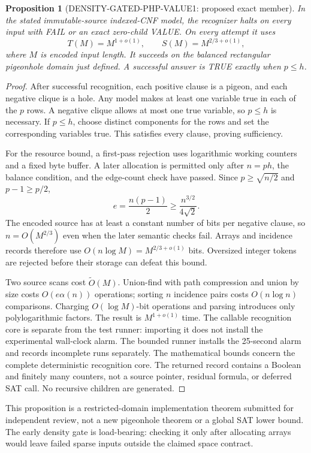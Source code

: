 \documentclass[11pt]{article}
\newtheorem{proposition}{Proposition}
\begin{document}
\begin{proposition}[DENSITY-GATED-PHP-VALUE1: proposed exact member]
In the stated immutable-source indexed-CNF model, the recognizer halts on every input with FAIL or an exact zero-child VALUE. On every attempt it uses
\[
 T(M)=M^{1+o(1)},\qquad S(M)=M^{2/3+o(1)},
\]
where $M$ is encoded input length. It succeeds on the balanced rectangular pigeonhole domain just defined. A successful answer is TRUE exactly when $p\le h$.
\end{proposition}
\begin{proof}
After successful recognition, each positive clause is a pigeon, and each negative clique is a hole. Any model makes at least one variable true in each of the $p$ rows. A negative clique allows at most one true variable, so $p\le h$ is necessary. If $p\le h$, choose distinct components for the rows and set the corresponding variables true. This satisfies every clause, proving sufficiency.

For the resource bound, a first-pass rejection uses logarithmic working counters and a fixed byte buffer. A later allocation is permitted only after $n=ph$, the balance condition, and the edge-count check have passed. Since $p\ge\sqrt{n/2}$ and $p-1\ge p/2$,
\[
 e=\frac{n(p-1)}2\ge \frac{n^{3/2}}{4\sqrt2}.
\]
The encoded source has at least a constant number of bits per negative clause, so $n=O(M^{2/3})$ even when the later semantic checks fail. Arrays and incidence records therefore use $O(n\log M)=M^{2/3+o(1)}$ bits. Oversized integer tokens are rejected before their storage can defeat this bound.

Two source scans cost $\widetilde O(M)$. Union-find with path compression and union by size costs $O(e\alpha(n))$ operations; sorting $n$ incidence pairs costs $O(n\log n)$ comparisons. Charging $O(\log M)$-bit operations and parsing introduces only polylogarithmic factors. The result is $M^{1+o(1)}$ time. The callable recognition core is separate from the test runner: importing it does not install the experimental wall-clock alarm. The bounded runner installs the 25-second alarm and records incomplete runs separately. The mathematical bounds concern the complete deterministic recognition core. The returned record contains a Boolean and finitely many counters, not a source pointer, residual formula, or deferred SAT call. No recursive children are generated.
\end{proof}

This proposition is a restricted-domain implementation theorem submitted for independent review, not a new pigeonhole theorem or a global SAT lower bound. The early density gate is load-bearing: checking it only after allocating arrays would leave failed sparse inputs outside the claimed space contract.
\end{document}
